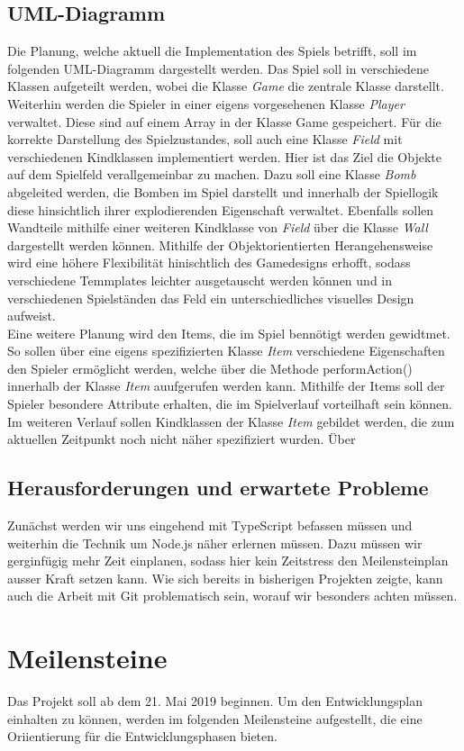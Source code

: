 \documentclass[10pt, a4paper]{report}
\begin{document}
	\subsection{UML-Diagramm}
	Die Planung, welche aktuell die Implementation des Spiels betrifft, soll im folgenden UML-Diagramm dargestellt werden. Das Spiel soll in verschiedene Klassen aufgeteilt werden, wobei die Klasse \textit{Game} die zentrale Klasse darstellt. Weiterhin werden die Spieler in einer eigens vorgesehenen Klasse \textit{Player} verwaltet. Diese sind auf einem Array in der Klasse Game gespeichert. Für die korrekte Darstellung des Spielzustandes, soll auch eine Klasse \textit{Field} mit verschiedenen Kindklassen implementiert werden. Hier ist das Ziel die Objekte auf dem Spielfeld verallgemeinbar zu machen. Dazu soll eine Klasse \textit{Bomb} abgeleited werden, die Bomben im Spiel darstellt und innerhalb der Spiellogik diese hinsichtlich ihrer explodierenden Eigenschaft verwaltet. Ebenfalls sollen Wandteile mithilfe einer weiteren Kindklasse von \textit{Field} über die Klasse \textit{Wall} dargestellt werden können. Mithilfe der Objektorientierten Herangehensweise wird eine höhere Flexibilität hinischtlich des Gamedesigns erhofft, sodass verschiedene Temmplates leichter ausgetauscht werden können und in verschiedenen Spielständen das Feld ein unterschiedliches visuelles Design aufweist.\\
	Eine weitere Planung wird den Items, die im Spiel bennötigt werden gewidtmet. So sollen über eine eigens spezifizierten Klasse \textit{Item} verschiedene Eigenschaften den Spieler ermöglicht werden, welche über die Methode performAction() innerhalb der Klasse \textit{Item} auufgerufen werden kann. Mithilfe der Items soll der Spieler besondere Attribute erhalten, die im Spielverlauf vorteilhaft sein können. Im weiteren Verlauf sollen Kindklassen der Klasse \textit{Item} gebildet werden, die zum aktuellen Zeitpunkt noch nicht näher spezifiziert wurden. Über
	\subsection{Herausforderungen und erwartete Probleme}
	Zunächst werden wir uns eingehend mit TypeScript befassen müssen und weiterhin die Technik um Node.js näher erlernen müssen. Dazu müssen wir gerginfügig mehr Zeit einplanen, sodass hier kein Zeitstress den Meilensteinplan ausser Kraft setzen kann. Wie sich bereits in bisherigen Projekten zeigte, kann auch die Arbeit mit Git problematisch sein, worauf wir besonders achten müssen.
	\section{Meilensteine}
	Das Projekt soll ab dem 21. Mai 2019 beginnen. Um den Entwicklungsplan einhalten zu können, werden im folgenden Meilensteine aufgestellt, die eine Oriientierung für
	die Entwicklungsphasen bieten. 
	
\end{document}
